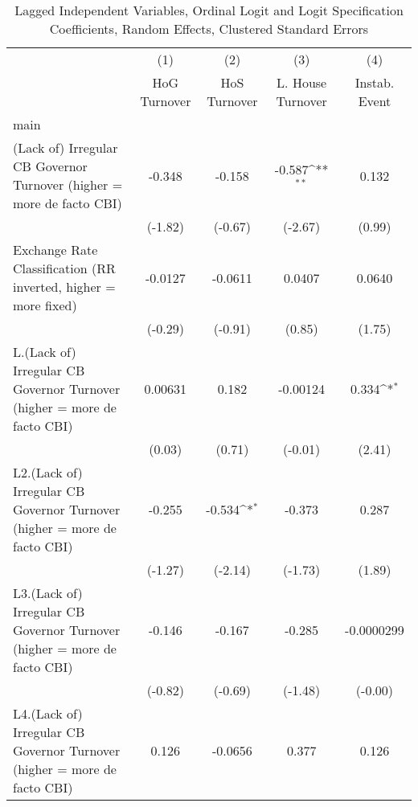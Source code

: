 {
\def\sym#1{\ifmmode^{#1}\else\(^{#1}\)\fi}
\begin{longtable}{l*{4}{c}}
\caption{Lagged Independent Variables, Ordinal Logit and Logit Specification Coefficients, Random Effects, Clustered Standard Errors \label{lagordLogLogDF}}\\
\hline\hline\endfirsthead\hline\endhead\hline\endfoot\endlastfoot
                &\multicolumn{1}{c}{(1)}&\multicolumn{1}{c}{(2)}&\multicolumn{1}{c}{(3)}&\multicolumn{1}{c}{(4)}\\
                &\multicolumn{1}{c}{HoG Turnover}&\multicolumn{1}{c}{HoS Turnover}&\multicolumn{1}{c}{L. House Turnover}&\multicolumn{1}{c}{Instab. Event}\\
\hline
main            &                  &                  &                  &                  \\
(Lack of) Irregular CB Governor Turnover (higher = more de facto CBI)&   -0.348         &   -0.158         &   -0.587\sym{**} &    0.132         \\
                &  (-1.82)         &  (-0.67)         &  (-2.67)         &   (0.99)         \\
[1em]
Exchange Rate Classification (RR inverted, higher = more fixed)&  -0.0127         &  -0.0611         &   0.0407         &   0.0640         \\
                &  (-0.29)         &  (-0.91)         &   (0.85)         &   (1.75)         \\
[1em]
L.(Lack of) Irregular CB Governor Turnover (higher = more de facto CBI)&  0.00631         &    0.182         & -0.00124         &    0.334\sym{*}  \\
                &   (0.03)         &   (0.71)         &  (-0.01)         &   (2.41)         \\
[1em]
L2.(Lack of) Irregular CB Governor Turnover (higher = more de facto CBI)&   -0.255         &   -0.534\sym{*}  &   -0.373         &    0.287         \\
                &  (-1.27)         &  (-2.14)         &  (-1.73)         &   (1.89)         \\
[1em]
L3.(Lack of) Irregular CB Governor Turnover (higher = more de facto CBI)&   -0.146         &   -0.167         &   -0.285         &-0.0000299         \\
                &  (-0.82)         &  (-0.69)         &  (-1.48)         &  (-0.00)         \\
[1em]
L4.(Lack of) Irregular CB Governor Turnover (higher = more de facto CBI)&    0.126         &  -0.0656         &    0.377         &    0.126         \\

\end{longtable}}
